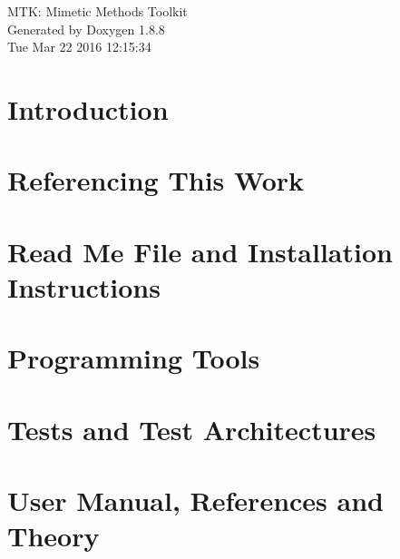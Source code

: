 \documentclass[twoside]{book}
\newcommand{\+}{\discretionary{\mbox{\scriptsize$\hookleftarrow$}}{}{}}
\newcommand{\clearemptydoublepage}{%
  \newpage{\pagestyle{empty}\cleardoublepage}%
}
\begin{document}
\hypersetup{pageanchor=false,
             bookmarks=true,
             bookmarksnumbered=true,
             pdfencoding=unicode
            }
\begin{titlepage}
\vspace*{7cm}
\begin{center}%
{\Large M\+T\+K\+: Mimetic Methods Toolkit }\\
\vspace*{1cm}
{\large Generated by Doxygen 1.8.8}\\
\vspace*{0.5cm}
{\small Tue Mar 22 2016 12:15:34}\\
\end{center}
\end{titlepage}
\clearemptydoublepage
\tableofcontents
\clearemptydoublepage
{}
\hypersetup{pageanchor=true}

\chapter{Introduction}
\label{index}\hypertarget{index}{}
\chapter{Referencing This Work}
\label{page_referencing}
\hypertarget{page_referencing}{}

\chapter{Read Me File and Installation Instructions}
\label{page_readme}
\hypertarget{page_readme}{}

\chapter{Programming Tools}
\label{section_prog_tools}
\hypertarget{section_prog_tools}{}

\chapter{Tests and Test Architectures}
\label{page_architectures}
\hypertarget{page_architectures}{}

\chapter{User Manual, References and Theory}
\label{page_ref_the}
\hypertarget{page_ref_the}{}

\end{document}
